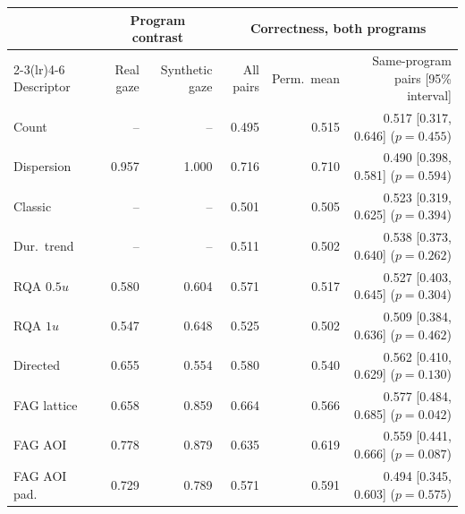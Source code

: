 \begin{tabular}{lrrrrr}
\toprule
 & \multicolumn{2}{c}{Program contrast} & \multicolumn{3}{c}{Correctness, both programs} \\
\cmidrule(lr){2-3}\cmidrule(lr){4-6}
Descriptor & Real gaze & Synthetic gaze & All pairs & Perm.\ mean & Same-program pairs [95\% interval] \\
\midrule
Count & -- & -- & 0.495 & 0.515 & 0.517 [0.317, 0.646] ($p = 0.455$) \\
Dispersion & 0.957 & 1.000 & 0.716 & 0.710 & 0.490 [0.398, 0.581] ($p = 0.594$) \\
Classic & -- & -- & 0.501 & 0.505 & 0.523 [0.319, 0.625] ($p = 0.394$) \\
Dur.\ trend & -- & -- & 0.511 & 0.502 & 0.538 [0.373, 0.640] ($p = 0.262$) \\
RQA $0.5u$ & 0.580 & 0.604 & 0.571 & 0.517 & 0.527 [0.403, 0.645] ($p = 0.304$) \\
RQA $1u$ & 0.547 & 0.648 & 0.525 & 0.502 & 0.509 [0.384, 0.636] ($p = 0.462$) \\
Directed & 0.655 & 0.554 & 0.580 & 0.540 & 0.562 [0.410, 0.629] ($p = 0.130$) \\
FAG lattice & 0.658 & 0.859 & 0.664 & 0.566 & 0.577 [0.484, 0.685] ($p = 0.042$) \\
FAG AOI & 0.778 & 0.879 & 0.635 & 0.619 & 0.559 [0.441, 0.666] ($p = 0.087$) \\
FAG AOI pad. & 0.729 & 0.789 & 0.571 & 0.591 & 0.494 [0.345, 0.603] ($p = 0.575$) \\
\bottomrule
\end{tabular}
